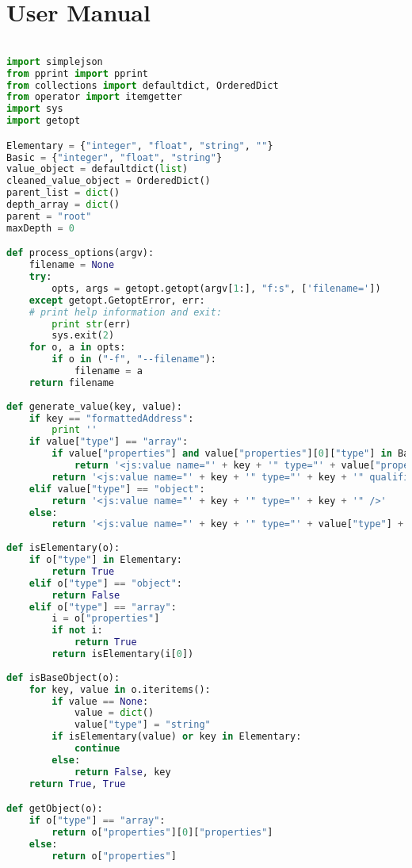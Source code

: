 \chapter{User Manual}
\label{appendiceA}
\thispagestyle{empty}
\begin{lstlisting}[language=python]

import simplejson
from pprint import pprint
from collections import defaultdict, OrderedDict
from operator import itemgetter
import sys
import getopt

Elementary = {"integer", "float", "string", ""}
Basic = {"integer", "float", "string"}
value_object = defaultdict(list)
cleaned_value_object = OrderedDict()
parent_list = dict()
depth_array = dict()
parent = "root"
maxDepth = 0

def process_options(argv):
	filename = None
	try:
		opts, args = getopt.getopt(argv[1:], "f:s", ['filename='])
	except getopt.GetoptError, err:
	# print help information and exit:
		print str(err)
		sys.exit(2)
	for o, a in opts:
		if o in ("-f", "--filename"):
			filename = a
	return filename
	
def generate_value(key, value):
	if key == "formattedAddress":
		print ''
	if value["type"] == "array":
		if value["properties"] and value["properties"][0]["type"] in Basic:
			return '<js:value name="' + key + '" type="' + value["properties"][0]["type"] + '" qualifier="list" />'
		return '<js:value name="' + key + '" type="' + key + '" qualifier="list" />'
	elif value["type"] == "object":
		return '<js:value name="' + key + '" type="' + key + '" />'
	else:
		return '<js:value name="' + key + '" type="' + value["type"] + '" />'
		
def isElementary(o):
	if o["type"] in Elementary:
		return True
	elif o["type"] == "object":
		return False
	elif o["type"] == "array":
		i = o["properties"]
		if not i:
			return True
		return isElementary(i[0])
		
def isBaseObject(o):
	for key, value in o.iteritems():
		if value == None:
			value = dict()
			value["type"] = "string"
		if isElementary(value) or key in Elementary:
			continue
		else:
			return False, key
	return True, True

def getObject(o):
	if o["type"] == "array":
		return o["properties"][0]["properties"]
	else:
		return o["properties"]


\end{lstlisting}
